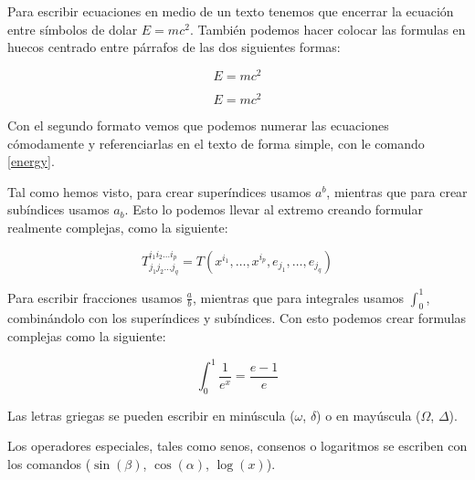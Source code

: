 

Para escribir ecuaciones en medio de un texto tenemos que encerrar la ecuación entre símbolos de dolar $E=mc^2$. También podemos hacer colocar las formulas en huecos centrado entre párrafos de las dos siguientes formas:

\[E=mc^2\]

\begin{equation}
    \label{energy}
    E=mc^2
\end{equation}

Con el segundo formato vemos que podemos numerar las ecuaciones cómodamente y referenciarlas en el texto de forma simple, con le comando \ref{energy}.

Tal como hemos visto, para crear superíndices usamos $a^b$, mientras que para crear subíndices usamos $a_b$. Esto lo podemos llevar al extremo creando formular realmente complejas, como la siguiente:

\[ T^{i_1 i_2 \dots i_p}_{j_1 j_2 \dots j_q} = T(x^{i_1},\dots,x^{i_p},e_{j_1},\dots,e_{j_q}) \]

Para escribir fracciones usamos $\frac{a}{b}$, mientras que para integrales usamos $\int_0^1$, combinándolo con los superíndices y subíndices. Con esto podemos crear formulas complejas como la siguiente:

\[ \int_0^1 \frac{1}{e^x} =  \frac{e-1}{e} \]

Las letras griegas se pueden escribir en minúscula ($\omega$, $\delta$) o en mayúscula ($\Omega$, $\Delta$).

Los operadores especiales, tales como senos, consenos o logaritmos se escriben con los comandos ($\sin(\beta)$, $\cos(\alpha)$, $\log(x)$).